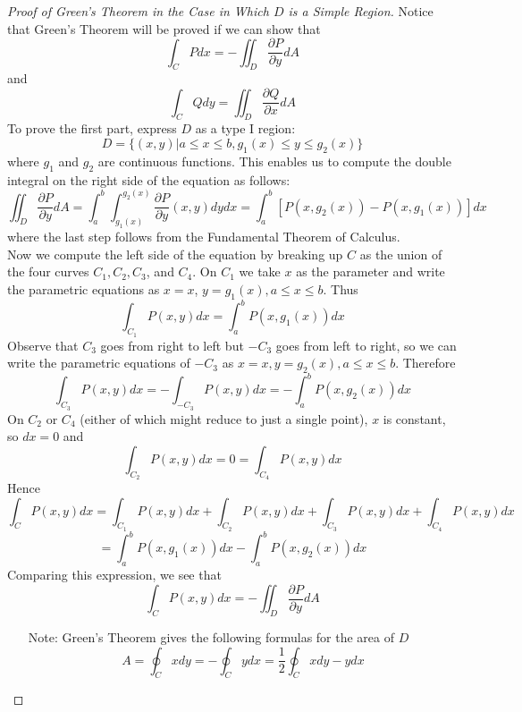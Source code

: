 \documentclass[10pt]{report}
\begin{document}
\begin{proof}[Proof of Green's Theorem in the Case in Which $D$ is a Simple Region]
Notice that Green's Theorem will be proved if we can show that
$$\int_C Pdx = -\iint_D\frac{\partial P}{\partial y}dA$$
and
$$\int_C Qdy = \iint_D \frac{\partial Q}{\partial x}dA$$
To prove the first part, express $D$ as a type I region:
$$D=\{(x,y)|a\leq x \leq b, g_1(x)\leq y \leq g_2(x)\}$$
where $g_1$ and $g_2$ are continuous functions. This enables us to compute the double integral on the right side of the equation as follows:
$$\iint_D \frac{\partial P}{\partial y}dA = \int_a^b \int_{g_1(x)}^{g_2(x)}\frac{\partial P}{\partial y}(x,y)dydx = \int_a^b[P(x,g_2(x))-P(x,g_1(x))]dx$$
where the last step follows from the Fundamental Theorem of Calculus.\\
Now we compute the left side of the equation by breaking up $C$ as the union of the four curves $C_1, C_2, C_3$, and $C_4$. On $C_1$ we take $x$ as the parameter and write the parametric equations as $x=x$, $y=g_1(x), a\leq x \leq b$. Thus
$$\int_{C_1} P(x,y)dx = \int_a^b P(x,g_1(x))dx$$
Observe that $C_3$ goes from right to left but $-C_3$ goes from left to right, so we can write the parametric equations of $-C_3$ as $x=x, y=g_2(x), a\leq x \leq b$. Therefore
$$\int_{C_3} P(x,y)dx = -\int_{-C_3} P(x,y)dx = -\int_a^b P(x,g_2(x))dx$$
On $C_2$ or $C_4$ (either of which might reduce to just a single point), $x$ is constant, so $dx=0$ and 
$$\int_{C_2} P(x,y)dx = 0 = \int_{C_4} P(x,y)dx$$
Hence
$$\int_C P(x,y)dx = \int_{C_1} P(x,y)dx + \int_{C_2} P(x,y)dx + \int_{C_3} P(x,y)dx + \int_{C_4} P(x,y)dx$$
$$=\int_a^b P(x,g_1(x))dx - \int_a^b P(x,g_2(x))dx$$
Comparing this expression, we see that
$$\int_C P(x,y)dx = -\iint_D \frac{\partial P}{\partial y} dA$$
\begin{itemize}
\item[Note:] Green's Theorem gives the following formulas for the area of $D$
$$A = \oint_C xdy = -\oint_C ydx = \frac{1}{2}\oint_C xdy-ydx$$
\end{itemize}
\end{proof}
\end{document}
